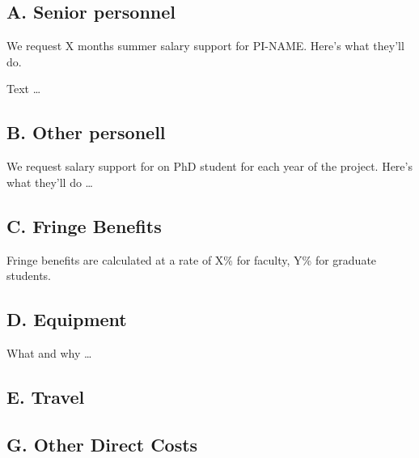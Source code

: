 \documentclass{proposalnsf}
\begin{document}

\newpage
{}
\renewcommand{\thepage} {G--\arabic{page}}

\subsection*{A. Senior personnel}
 We request X months summer salary support for PI-NAME. Here's what they'll do.

 Text \dots

\subsection*{B. Other personell}
 We request salary support for on PhD student for each year of the project. Here's what they'll do \dots

\subsection*{C. Fringe Benefits}
Fringe benefits are calculated at a rate of X\% for faculty, Y\% for graduate students.  

\subsection*{D. Equipment}
What and why \dots

\subsection*{E. Travel}
%

\subsection*{G. Other Direct Costs}
\end{document}
